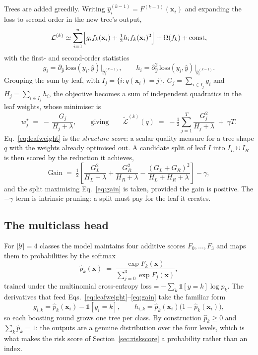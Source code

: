 \documentclass[11pt,a4paper]{article}
\begin{document}
Trees are added greedily. Writing $\hat{y}^{(k-1)}_i = F^{(k-1)}(\mathbf{x}_i)$
and expanding the loss to second order in the new tree's output,
\[
  \mathcal{L}^{(k)} \simeq \sum_{i=1}^n
     \Bigl[ g_i f_k(\mathbf{x}_i) + \tfrac{1}{2} h_i f_k(\mathbf{x}_i)^2 \Bigr]
     + \Omega(f_k) + \text{const},
\]
with the first- and second-order statistics
\[
  g_i = \partial_{\hat{y}}\,\mathrm{loss}(y_i,\hat{y})\big|_{\hat{y}^{(k-1)}_i},
  \qquad
  h_i = \partial^2_{\hat{y}}\,\mathrm{loss}(y_i,\hat{y})\big|_{\hat{y}^{(k-1)}_i}.
\]
Grouping the sum by leaf, with $I_j = \{i : q(\mathbf{x}_i)=j\}$,
$G_j = \sum_{i\in I_j} g_i$ and $H_j = \sum_{i\in I_j} h_i$, the objective becomes
a sum of independent quadratics in the leaf weights, whose minimiser is
\begin{equation}
\label{eq:leafweight}
  w_j^\star \;=\; -\,\frac{G_j}{H_j + \lambda},
  \qquad\text{giving}\qquad
  \tilde{\mathcal{L}}^{(k)}(q) \;=\; -\tfrac{1}{2}\sum_{j=1}^{T}\frac{G_j^2}{H_j+\lambda}
  \;+\; \gamma T .
\end{equation}
Eq.~\eqref{eq:leafweight} is the \emph{structure score}: a scalar quality measure
for a tree shape $q$ with the weights already optimised out. A candidate split of
leaf $I$ into $I_L \uplus I_R$ is then scored by the reduction it achieves,
\begin{equation}
\label{eq:gain}
  \mathrm{Gain} \;=\; \tfrac{1}{2}\left[
     \frac{G_L^2}{H_L+\lambda} + \frac{G_R^2}{H_R+\lambda}
     - \frac{(G_L+G_R)^2}{H_L+H_R+\lambda}\right] - \gamma ,
\end{equation}
and the split maximising Eq.~\eqref{eq:gain} is taken, provided the gain is
positive. The $-\gamma$ term is intrinsic pruning: a split must pay for the leaf it
creates.

\subsection{The multiclass head}

For $|\mathcal{Y}|=4$ classes the model maintains four additive scores
$F_0,\dots,F_3$ and maps them to probabilities by the softmax
\begin{equation}
\label{eq:softmax}
  \hat{p}_k(\mathbf{x}) \;=\; \frac{\exp F_k(\mathbf{x})}
                                   {\sum_{j=0}^{3}\exp F_j(\mathbf{x})},
\end{equation}
trained under the multinomial cross-entropy
$\mathrm{loss} = -\sum_k \mathbb{1}[y=k]\log \hat p_k$. The derivatives that feed
Eqs.~\eqref{eq:leafweight}--\eqref{eq:gain} take the familiar form
\[
  g_{i,k} = \hat{p}_k(\mathbf{x}_i) - \mathbb{1}[y_i=k],
  \qquad
  h_{i,k} = \hat{p}_k(\mathbf{x}_i)\bigl(1-\hat{p}_k(\mathbf{x}_i)\bigr),
\]
so each boosting round grows one tree per class. By construction
$\hat{p}_k \ge 0$ and $\sum_k \hat{p}_k = 1$: the outputs are a genuine
distribution over the four levels, which is what makes the risk score of
Section~\ref{sec:riskscore} a probability rather than an index.
\end{document}
